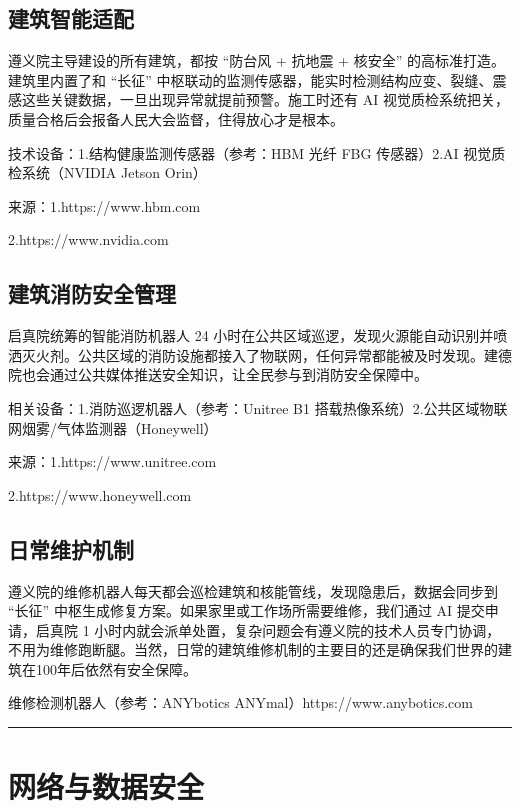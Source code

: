 \subsection{建筑智能适配}\label{ux5efaux7b51ux667aux80fdux9002ux914d}

遵义院主导建设的所有建筑，都按 ``防台风 + 抗地震 + 核安全'' 的高标准打造。建筑里内置了和 ``长征'' 中枢联动的监测传感器，能实时检测结构应变、裂缝、震感这些关键数据，一旦出现异常就提前预警。施工时还有 AI 视觉质检系统把关，质量合格后会报备人民大会监督，住得放心才是根本。

技术设备：1.结构健康监测传感器（参考：HBM 光纤 FBG 传感器）2.AI 视觉质检系统（NVIDIA Jetson Orin）

来源：1.https://www.hbm.com

2.https://www.nvidia.com

\subsection{建筑消防安全管理}\label{ux5efaux7b51ux6d88ux9632ux5b89ux5168ux7ba1ux7406}

启真院统筹的智能消防机器人 24 小时在公共区域巡逻，发现火源能自动识别并喷洒灭火剂。公共区域的消防设施都接入了物联网，任何异常都能被及时发现。建德院也会通过公共媒体推送安全知识，让全民参与到消防安全保障中。

相关设备：1.消防巡逻机器人（参考：Unitree B1 搭载热像系统）2.公共区域物联网烟雾/气体监测器（Honeywell）

来源：1.https://www.unitree.com

2.https://www.honeywell.com

\subsection{日常维护机制}\label{ux65e5ux5e38ux7ef4ux62a4ux673aux5236}

遵义院的维修机器人每天都会巡检建筑和核能管线，发现隐患后，数据会同步到 ``长征'' 中枢生成修复方案。如果家里或工作场所需要维修，我们通过 AI 提交申请，启真院 1 小时内就会派单处置，复杂问题会有遵义院的技术人员专门协调，不用为维修跑断腿。当然，日常的建筑维修机制的主要目的还是确保我们世界的建筑在100年后依然有安全保障。

维修检测机器人（参考：ANYbotics ANYmal）https://www.anybotics.com

\begin{center}\rule{0.5\linewidth}{0.5pt}\end{center}

\section{网络与数据安全}\label{ux7f51ux7edcux4e0eux6570ux636eux5b89ux5168}

